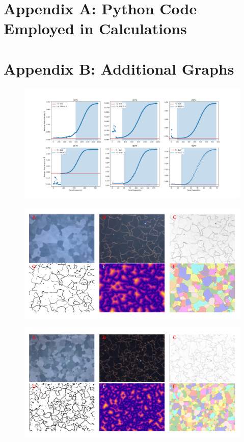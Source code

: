 \documentclass[12pt, titlepage]{article}
\begin{document}
\section{Appendix A: Python Code Employed in Calculations}

\section{Appendix B: Additional Graphs}

	\begin{figure}[h]
		\centering
		\includegraphics[width=1.0\linewidth]{jmak_2.png}
		\caption{}
		\label{fig:jmak_2}
	\end{figure}

	\begin{figure}[h]
		\centering
		\includegraphics[width=1.0\linewidth]{microstructure_0C.png}
		\caption{}
		\label{fig:micro_0C}
	\end{figure}

	\begin{figure}[h]
		\centering
		\includegraphics[width=1.0\linewidth]{microstructure_10C.png}
		\caption{}
		\label{fig:micro_10C}
	\end{figure}
\end{document}
